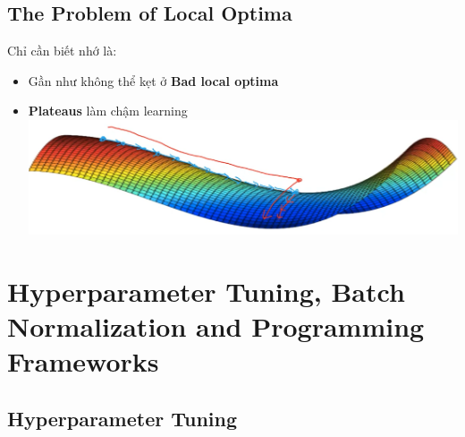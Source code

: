 \documentclass[12pt,a4paper]{report}
\begin{document}
	\section{The Problem of Local Optima}
		Chỉ cần biết nhớ là: 
		\begin{itemize}
			\item Gần như không thể kẹt ở \textbf{Bad local optima}
			\item \textbf{Plateaus} làm chậm learning \\
				\includegraphics[scale=0.5]{5}
		\end{itemize}
\chapter{Hyperparameter Tuning, Batch Normalization and Programming Frameworks}
	\section{Hyperparameter Tuning}
\end{document}

